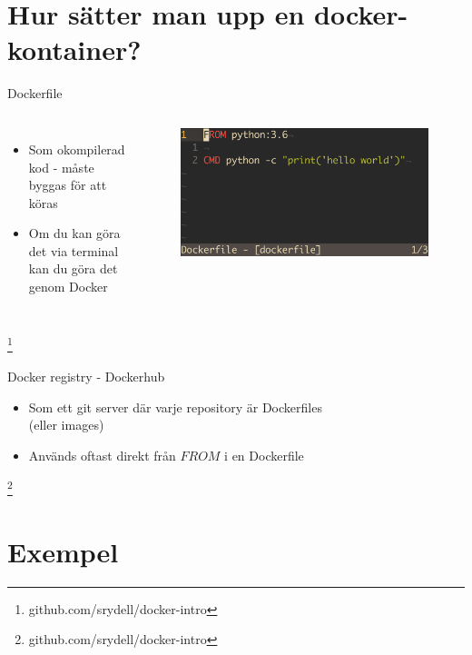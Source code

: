 \documentclass[12pt]{beamer}
\newcommand\blfootnote[1]{%
  \begingroup
  \renewcommand\thefootnote{}\footnote{#1}%
  \addtocounter{footnote}{-1}%
  \endgroup
}
\begin{document}
\section{Hur sätter man upp en docker-kontainer?}

\begin{frame}{Dockerfile}
   \begin{columns}
        \column{.25in}
        \column{2in}
        \begin{itemize}
            \item Som okompilerad kod - måste byggas för att köras
            \item Om du kan göra det via terminal kan du göra det genom Docker
        \end{itemize}
        \column{2.5in}
            \begin{figure}[h!]
                \centering
                \includegraphics[width=.8\textwidth]{../figures/simpleDockerfile.png}
            \end{figure}
    \end{columns}
    \blfootnote{github.com/srydell/docker-intro}
\end{frame}

\begin{frame}{Docker registry - Dockerhub}
    \begin{itemize}
        \item Som ett git server där varje repository är Dockerfiles \\(eller images)
        \item Används oftast direkt från $FROM$ i en Dockerfile
    \end{itemize}
    \blfootnote{github.com/srydell/docker-intro}
\end{frame}
\section{Exempel}
\end{document}
